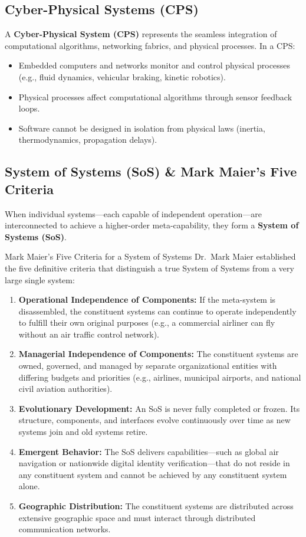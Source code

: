 \subsection{Cyber-Physical Systems (CPS)}
A \textbf{Cyber-Physical System (CPS)} represents the seamless integration of computational algorithms, networking fabrics, and physical processes. In a CPS:
\begin{itemize}[leftmargin=1.5em]
    \item Embedded computers and networks monitor and control physical processes (e.g., fluid dynamics, vehicular braking, kinetic robotics).
    \item Physical processes affect computational algorithms through sensor feedback loops.
    \item Software cannot be designed in isolation from physical laws (inertia, thermodynamics, propagation delays).
\end{itemize}

\subsection{System of Systems (SoS) \& Mark Maier's Five Criteria}
When individual systems—each capable of independent operation—are interconnected to achieve a higher-order meta-capability, they form a \textbf{System of Systems (SoS)}.

\begin{definitionbox}{Mark Maier's Five Criteria for a System of Systems}
Dr.~Mark Maier established the five definitive criteria that distinguish a true System of Systems from a very large single system:
\begin{enumerate}[leftmargin=2em]
    \item \textbf{Operational Independence of Components:} If the meta-system is disassembled, the constituent systems can continue to operate independently to fulfill their own original purposes (e.g., a commercial airliner can fly without an air traffic control network).
    \item \textbf{Managerial Independence of Components:} The constituent systems are owned, governed, and managed by separate organizational entities with differing budgets and priorities (e.g., airlines, municipal airports, and national civil aviation authorities).
    \item \textbf{Evolutionary Development:} An SoS is never fully completed or frozen. Its structure, components, and interfaces evolve continuously over time as new systems join and old systems retire.
    \item \textbf{Emergent Behavior:} The SoS delivers capabilities—such as global air navigation or nationwide digital identity verification—that do not reside in any constituent system and cannot be achieved by any constituent system alone.
    \item \textbf{Geographic Distribution:} The constituent systems are distributed across extensive geographic space and must interact through distributed communication networks.
\end{enumerate}
\end{definitionbox}

